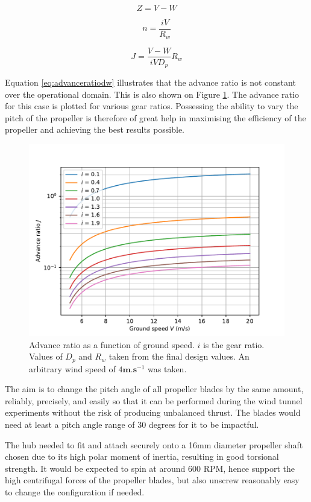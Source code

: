 \begin{equation}
    Z = V-W
    \label{eq:relativevel}
\end{equation}

\begin{equation}
    n = \frac{i V}{R_w}
    \label{eq:rpm}
\end{equation}

\begin{equation}
    J = \frac{V-W}{i V D_p}R_w
    \label{eq:advanceratiodw}
\end{equation}

Equation \ref{eq:advanceratiodw} illustrates that the advance ratio is not constant over the operational domain. This is also shown on Figure \ref{fig:advanceratios}. The advance ratio for this case is plotted for various gear ratios. Possessing the ability to vary the pitch of the propeller is therefore of great help in maximising the efficiency of the propeller and achieving the best results possible.

\begin{figure}
    \centering
    \includegraphics[width = 0.7\linewidth]{images/part7/advance ratios.pdf}
    \caption{Advance ratio as a function of ground speed. $i$ is the gear ratio. Values of $D_p$ and $R_w$ taken from the final design values. An arbitrary wind speed of $4\mathbf{m.s}^{-1}$ was taken.}
    \label{fig:advanceratios}
\end{figure}

The aim is to change the pitch angle of all propeller blades by the same amount, reliably, precisely, and easily so that it can be performed during the wind tunnel experiments without the risk of producing unbalanced thrust. The blades would need at least a pitch angle range of 30 degrees for it to be impactful.

The hub needed to fit and attach securely onto a 16mm diameter propeller shaft chosen due to its high polar moment of inertia, resulting in good torsional strength. It would be expected to spin at around 600 RPM, hence support the high centrifugal forces of the propeller blades, but also unscrew reasonably easy to change the configuration if needed.

